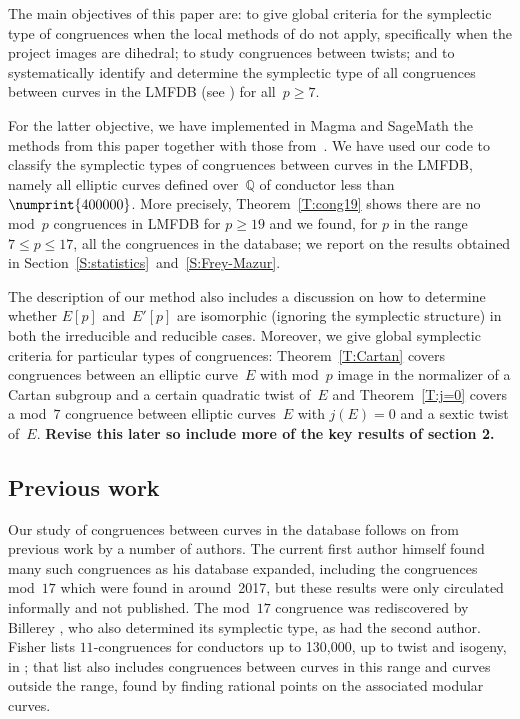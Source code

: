 \documentclass[12pt, reqno]{amsart}
\newcommand{\Q}{\mathbb{Q}}
\newcommand{\rhobar}{{\overline{\rho}}}
\numberwithin{equation}{section}
\theoremstyle{definition}
\theoremstyle{remark}
\newcommand{\Sage}{{\sc SageMath}}
\newcommand{\Magma}{{\sc Magma}}
\begin{document}
The main objectives of this paper are: to give global criteria for the
symplectic type of congruences when the local methods of \cite{FKSym}
do not apply, specifically when the project images are dihedral; to
study congruences between twists; and to systematically identify and
determine the symplectic type of all congruences between curves in the
LMFDB (see \cite{lmfdb})
for all~$p\ge7$.


For the latter objective, we have implemented in {\Magma} \cite{magma}
and {\Sage} \cite{sage} the methods from this paper together with
those from~\cite{FKSym}. We have used our code to classify the
symplectic types of congruences between curves in the LMFDB, namely
all elliptic curves defined over~$\Q$ of conductor less
than~$\numprint{400000}$. More precisely, Theorem~\ref{T:cong19} shows
there are no mod~$p$ congruences in LMFDB for $p \geq 19$ and we
found, for $p$ in the range $7 \leq p \leq 17$, all the congruences in
the database; we report on the results obtained in
Section~\ref{S:statistics}~and~\ref{S:Frey-Mazur}.

The description of our method also includes a discussion on how to
determine whether $E[p]$ and~$E'[p]$ are isomorphic (ignoring the
symplectic structure) in both the irreducible and reducible
cases. Moreover, we give global symplectic criteria for particular
types of congruences: Theorem~\ref{T:Cartan} covers congruences
between an elliptic curve~$E$ with mod~$p$ image in the normalizer of
a Cartan subgroup and a certain quadratic twist of~$E$ and
Theorem~\ref{T:j=0} covers a mod~$7$ congruence between elliptic
curves~$E$ with $j(E)=0$ and a sextic twist of~$E$.
\textbf{Revise this later so include more of the key results of
  section 2.}

\subsection{Previous work}
Our study of congruences between curves in the database follows on
from previous work by a number of authors.  The current first author
himself found many such congruences as his database expanded,
including the congruences mod~$17$ which were found in around~2017,
but these results were only circulated informally and not published.
The mod~$17$ congruence was rediscovered by Billerey
\cite{Billerey17}, who also determined its symplectic type, as had the
second author.  Fisher lists $11$-congruences for conductors up to
130,000, up to twist and isogeny, in \cite{FisherList}; that list also
includes congruences between curves in this range and curves outside
the range, found by finding rational points on the associated modular
curves.
\end{document}
